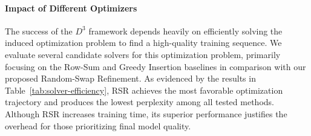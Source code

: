 \paragraph{Impact of Different Optimizers}
The success of the $D^3$ framework depends heavily on efficiently solving the induced optimization problem to find a high-quality training sequence. We evaluate several candidate solvers for this optimization problem, primarily focusing on the Row-Sum and Greedy Insertion baselines in comparison with our proposed Random-Swap Refinement. As evidenced by the results in Table~\ref{tab:solver-efficiency}, RSR achieves the most favorable optimization trajectory and produces the lowest perplexity among all tested methods. Although RSR increases training time, its superior performance justifies the overhead for those prioritizing final model quality.
\begin{table}[htbp]
  \centering
  \caption{Efficiency and performance comparison of batch ordering solvers for GPT-2 Medium pre-training. Experiments are conducted on NVIDIA H200 GPUs.}
  \vspace{-1mm} 
  \label{tab:solver-efficiency}
  \vspace{-1mm}
\end{table}


